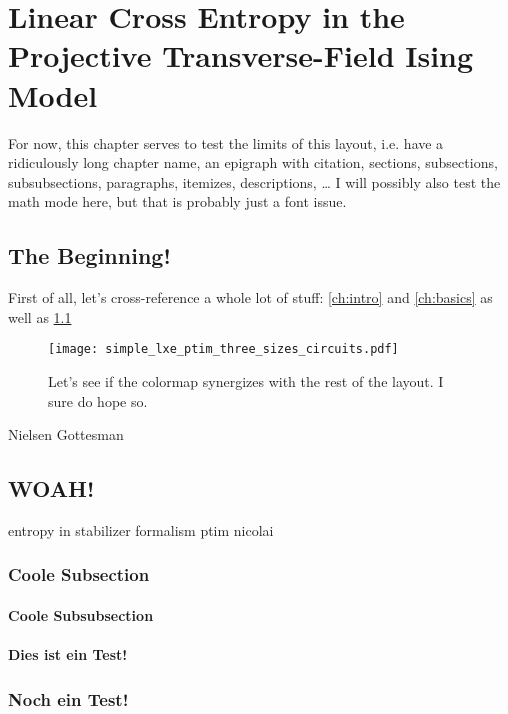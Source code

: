 \chapter{Linear Cross Entropy in the Projective Transverse-Field Ising Model}
\label{ch:lxe-ptim}
For now, this chapter serves to test the limits of this layout, i.e. have a
ridiculously long chapter name, an epigraph with citation, sections,
subsections, subsubsections, paragraphs, itemizes, descriptions, \ldots
I will possibly also test the math mode here, but that is probably just a font
issue.
\section{The Beginning!}
First of all, let's cross-reference a whole lot of stuff: \cref{ch:intro} and
\cref{ch:basics} as well as \cref{fig:firstattempt-lxe}

\begin{figure}
  \centering
  \texttt{[image: simple\_lxe\_ptim\_three\_sizes\_circuits.pdf]}
  \caption{Let's see if the colormap synergizes with the rest of the layout. I
  sure do hope so.}
  \label{fig:firstattempt-lxe}
\end{figure}

\lipsum[0-2]
Nielsen \cite{nielsenQuantumComputationQuantum2010} Gottesman
\cite{gottesmanStabilizerCodesQuantum1997}
\cite{aaronsonImprovedSimulationStabilizer2004}
\section{WOAH!}
\lipsum[3]
entropy in stabilizer formalism
\cite{fattalEntanglementStabilizerFormalism2004}
ptim nicolai \cite{langEntanglementTransitionProjective2020}
\subsection{Coole Subsection}
\lipsum[4-6]
\cite{roserDecodingProjectiveTransverse2023}
\subsubsection{Coole Subsubsection}
\lipsum[7-9]
\subsubsection{Dies ist ein Test!}
\lipsum[10-11]
\subsection{Noch ein Test!}
\lipsum[12-14]
\cite{tikhanovskayaUniversalityCrossEntropy2023}
